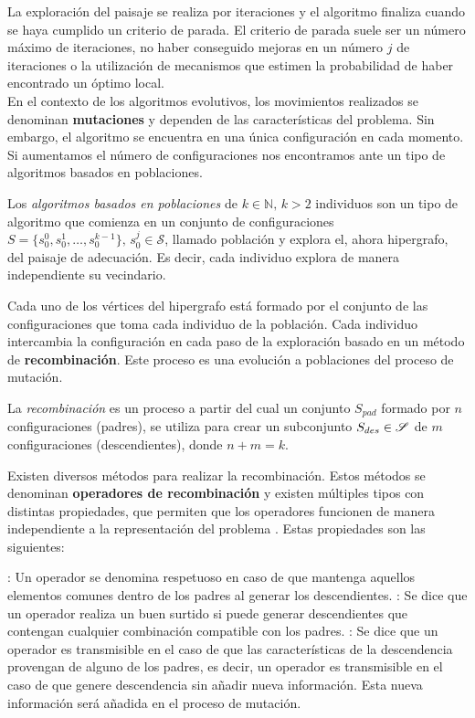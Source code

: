 La exploración del paisaje se realiza por iteraciones y el algoritmo finaliza cuando se haya cumplido un criterio de parada. El criterio de parada suele ser un número máximo de iteraciones, no haber conseguido mejoras en un número $j$ de iteraciones o la utilización de mecanismos que estimen la probabilidad de haber encontrado un óptimo local.\\

En el contexto de los algoritmos evolutivos, los movimientos realizados se denominan \textbf{mutaciones} y dependen de las características del problema. Sin embargo, el algoritmo se encuentra en una única configuración en cada momento. Si aumentamos el número de configuraciones nos encontramos ante un tipo de algoritmos basados en poblaciones.

\begin{definition}
    Los \textit{algoritmos basados en poblaciones} de $k\in\mathbb{N},\,k>2$ individuos son un tipo de algoritmo que comienza en un conjunto de configuraciones $S=\{s_0^0,s_0^1,\ldots,s_0^{k-1}\},\, s_0^j\in\mathcal{S}$, llamado población y explora el, ahora hipergrafo, del paisaje de adecuación. Es decir, cada individuo explora de manera independiente su vecindario.
\end{definition}

Cada uno de los vértices del hipergrafo está formado por el conjunto de las configuraciones que toma cada individuo de la población. Cada individuo intercambia la configuración en cada paso de la exploración basado en un método de \textbf{recombinación}. Este proceso es una evolución a poblaciones del proceso de mutación.

\begin{definition}\label{def:recombinacion}
    La \textit{recombinación} es un proceso a partir del cual un conjunto $S_{pad}$ formado por $n$ configuraciones (padres), se utiliza para crear un subconjunto $S_{des}\in\mathscr{S}$ de $m$ configuraciones (descendientes), donde $n+m=k$. 
\end{definition}

Existen diversos métodos para realizar la recombinación. Estos métodos se denominan \textbf{operadores de recombinación} y existen múltiples tipos con distintas propiedades, que permiten que los operadores funcionen de manera independiente a la representación del problema \cite{memetic}. Estas propiedades son las siguientes:
\begin{itemize}
    : Un operador se denomina respetuoso en caso de que mantenga aquellos elementos comunes dentro de los padres al generar los descendientes.
    : Se dice que un operador realiza un buen surtido si puede generar descendientes que contengan cualquier combinación compatible con los padres.
    : Se dice que un operador es transmisible en el caso de que las características de la descendencia provengan de alguno de los padres, es decir, un operador es transmisible en el caso de que genere descendencia sin añadir nueva información. Esta nueva información será añadida en el proceso de mutación.
\end{itemize}

